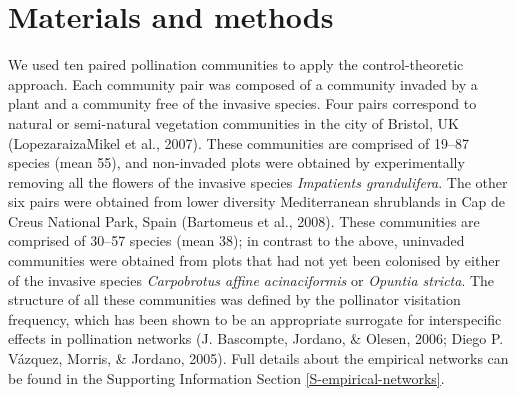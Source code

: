 \documentclass[a4paper]{artikel1}
\theoremstyle{definition}
\theoremstyle{definition}
\theoremstyle{definition}
\theoremstyle{remark}
\begin{document}
\section{Materials and methods}\label{materials-and-methods}

We used ten paired pollination communities to apply the
control-theoretic approach. Each community pair was composed of a
community invaded by a plant and a community free of the invasive
species. Four pairs correspond to natural or semi-natural vegetation
communities in the city of Bristol, UK (Lopezaraiza\textendash{}Mikel et
al., 2007). These communities are comprised of 19--87 species (mean 55),
and non-invaded plots were obtained by experimentally removing all the
flowers of the invasive species \emph{Impatients grandulifera}. The
other six pairs were obtained from lower diversity Mediterranean
shrublands in Cap de Creus National Park, Spain (Bartomeus et al.,
2008). These communities are comprised of 30--57 species (mean 38); in
contrast to the above, uninvaded communities were obtained from plots
that had not yet been colonised by either of the invasive species
\emph{Carpobrotus affine acinaciformis} or \emph{Opuntia stricta}. The
structure of all these communities was defined by the pollinator
visitation frequency, which has been shown to be an appropriate
surrogate for interspecific effects in pollination networks (J.
Bascompte, Jordano, \& Olesen, 2006; Diego P. Vázquez, Morris, \&
Jordano, 2005). Full details about the empirical networks can be found
in the Supporting Information Section \ref{S-empirical-networks}.
\end{document}
